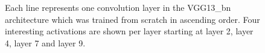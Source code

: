 \begin{figure}[!h]
\centering
\caption{Each line represents one convolution layer in the VGG13\_bn architecture which was trained from scratch in ascending order. Four interesting activations are shown per layer starting at layer 2, layer 4, layer 7 and layer 9.}


\end{figure}

